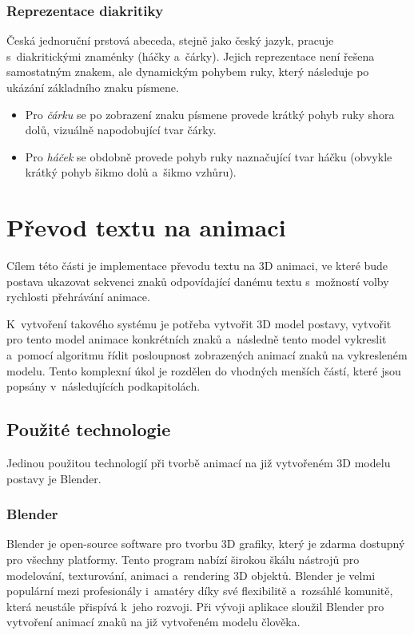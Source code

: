 \documentclass[
  master,
  program=ainfvs,
  biblatex,
  figures=true,
  tables=false,
  sourcecodes=true,
  glossaries,
  index
]{kidiplom}
\begin{document}
        \subsubsection{Reprezentace diakritiky}
        
            Česká jednoruční prstová abeceda, stejně jako český jazyk, pracuje s~diakritickými znaménky (háčky a~čárky). Jejich reprezentace není řešena samostatným znakem, ale dynamickým pohybem ruky, který následuje po ukázání základního znaku písmene.
        
            \begin{itemize}
                \item Pro \emph{čárku} se po zobrazení znaku písmene provede krátký pohyb ruky shora dolů, vizuálně napodobující tvar čárky.
                \item Pro \emph{háček} se obdobně provede pohyb ruky naznačující tvar háčku (obvykle krátký pohyb šikmo dolů a~šikmo vzhůru).
            \end{itemize}
    
\clearpage



\section{Převod textu na animaci}
    Cílem této části je implementace převodu textu na 3D animaci, ve které bude postava ukazovat sekvenci znaků odpovídající danému textu s~možností volby rychlosti přehrávání animace.
    
    K~vytvoření takového systému je potřeba vytvořit 3D model postavy, vytvořit pro tento model animace konkrétních znaků a~následně tento model vykreslit a~pomocí algoritmu řídit posloupnost zobrazených animací znaků na vykresleném modelu. 
    Tento komplexní úkol je rozdělen do vhodných menších částí, které jsou popsány v~následujících podkapitolách.
    
    \subsection{Použité technologie}
        Jedinou použitou technologií při tvorbě animací na již vytvořeném 3D modelu postavy je Blender.
        
        \subsubsection{Blender}
            Blender je open-source software pro tvorbu 3D grafiky, který je zdarma dostupný pro všechny platformy. Tento program nabízí širokou škálu nástrojů pro modelování, texturování, animaci a~rendering 3D objektů. Blender je velmi populární mezi profesionály i~amatéry díky své flexibilitě a~rozsáhlé komunitě, která neustále přispívá k~jeho rozvoji. 
            Při vývoji aplikace sloužil Blender pro vytvoření animací znaků na již vytvořeném modelu člověka. \cite{blender}
\end{document}
